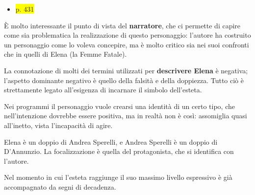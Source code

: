 \documentclass{book}
\newcommand{\pagine}[1]{\colorbox{yellow}{#1}}
\newcommand{\evidenziatore}[1]{\textbf{#1}}
\begin{document}
\begin{itemize}
\item
  \pagine{p. 431}
\end{itemize}

È molto interessante il punto di vista del
\evidenziatore{\textbf{narratore}}, che ci permette di capire come sia
problematica la realizzazione di questo personaggio: l'autore ha
costruito un personaggio come lo voleva concepire, ma è molto critico
sia nei suoi confronti che in quelli di Elena (la Femme Fatale).

La connotazione di molti dei termini utilizzati per
\evidenziatore{descrivere Elena} è negativa; l'aspetto dominante
negativo è quello della falsità e della doppiezza. Tutto ciò è
strettamente legato all'esigenza di incarnare il simbolo dell'esteta.

Nei programmi il personaggio vuole crearsi una identità di un certo
tipo, che nell'intenzione dovrebbe essere positiva, ma in realtà non è
così: assomiglia quasi all'inetto, vista l'incapacità di agire.

Elena è un doppio di Andrea Sperelli, e Andrea Sperelli è un doppio di
D'Annunzio. La focalizzazione è quella del protagonista, che si
identifica con l'autore.

Nel momento in cui l'esteta raggiunge il suo massimo livello espressivo
è già accompagnato da segni di decadenza.
\end{document}
